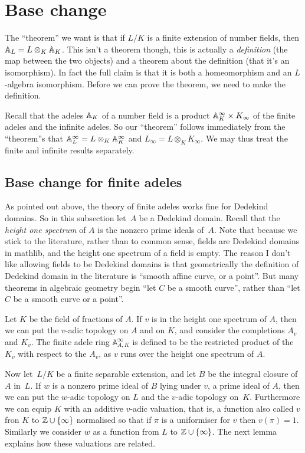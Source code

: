 \section{Base change}

The ``theorem'' we want is that if $L/K$ is a finite extension of number fields,
then $\mathbb{A}_L=L\otimes_K\mathbb{A}_K$. This isn't a theorem though, this is actually a \emph{definition}
(the map between the two objects) and a theorem about
the definition (that it's an isomorphism). In fact the full claim is that it is both a homeomorphism
and an $L$-algebra isomorphism. Before we can prove the theorem, we need to make the
definition.

Recall that the adeles $\mathbb{A}_K$ of a number field is a product $\mathbb{A}_K^\infty\times K_\infty$
of the finite adeles and the infinite adeles. So our ``theorem'' follows immediately from
the ``theorem''s that $\mathbb{A}_L^\infty=L\otimes_K\mathbb{A}_K^\infty$ and $L_\infty=L\otimes_KK_\infty$.
We may thus treat the finite and infinite results separately.

\subsection{Base change for finite adeles}

As pointed out above, the theory of finite adeles works fine for Dedekind domains.
So in this subsection let~$A$ be a Dedekind domain. Recall that the \emph{height one spectrum}
of $A$ is the nonzero prime ideals of~$A$. Note that because we stick to the literature,
rather than to common sense, fields are Dedekind domains in mathlib, and the
height one spectrum of a field is empty. The reason I don't like allowing fields
to be Dedekind domains is that geometrically the definition of Dedekind
domain in the literature is ``smooth affine curve, or a point''. But many theorems in algebraic
geometry begin ``let $C$ be a smooth curve'', rather than ``let $C$ be a smooth curve or a point''.

Let $K$ be the field of fractions of $A$. If $v$ is in the height one spectrum of $A$,
then we can put the $v$-adic topology on $A$ and on $K$, and consider the completions
$A_v$ and $K_v$. The finite adele ring $\mathbb{A}_{A,K}^\infty$ is defined to be
the restricted product of the $K_v$ with respect to the $A_v$, as $v$ runs over
the height one spectrum of $A$.

Now let~$L/K$ be a finite separable extension, and let $B$ be the integral closure of~$A$ in~$L$.
If $w$ is a nonzero prime ideal of $B$ lying under $v$, a prime ideal of $A$, then we can put the
$w$-adic topology on $L$ and the $v$-adic topology on~$K$. Furthermore
we can equip $K$ with an additive $v$-adic valuation, that is,
a function also called $v$ fron $K$ to $\mathbb{Z}\cup\{\infty\}$ normalised so that if $\pi$ is a uniformiser
for $v$ then $v(\pi)=1$. Similarly we consider $w$ as a function from $L$ to $\mathbb{Z}\cup\{\infty\}$.
The next lemma explains how these valuations are related.

